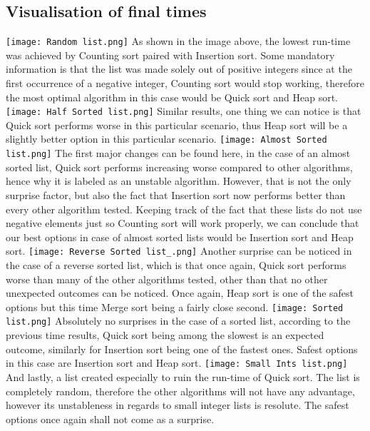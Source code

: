 \documentclass{article}
\begin{document}
\begin{center}
\section{Visualisation of final times}    

\texttt{[image: Random list.png]}
As shown in the image above, the lowest run-time was achieved by Counting sort paired with Insertion sort. Some mandatory information is that the list was made solely out of positive integers since at the first occurrence of a negative integer, Counting sort would stop working, therefore the most optimal algorithm in this case would be Quick sort and Heap sort.
\bigbreak
\texttt{[image: Half Sorted list.png]}
Similar results, one thing we can notice is that Quick sort performs worse in this particular scenario, thus Heap sort will be a slightly better option in this particular scenario.
\texttt{[image: Almost Sorted list.png]}
The first major changes can be found here, in the case of an almost sorted list, Quick sort performs increasing worse compared to other algorithms, hence why it is labeled as an unstable algorithm. However, that is not the only surprise factor, but also the fact that Insertion sort now performs better than every other algorithm tested. Keeping track of the fact that these lists do not use negative elements just so Counting sort will work properly, we can conclude that our best options in case of almost sorted lists would be Insertion sort and Heap sort.
\bigbreak
\texttt{[image: Reverse Sorted list\_.png]}
Another surprise can be noticed in the case of a reverse sorted list, which is that once again, Quick sort performs worse than many of the other algorithms tested, other than that no other unexpected outcomes can be noticed. Once again, Heap sort is one of the safest options but this time Merge sort being a fairly close second.
\texttt{[image: Sorted list.png]}
Absolutely no surprises in the case of a sorted list, according to the previous time results, Quick sort being among the slowest is an expected outcome, similarly for Insertion sort being one of the fastest ones. Safest options in this case are Insertion sort and Heap sort.
\bigbreak
\texttt{[image: Small Ints list.png]}
And lastly, a list created especially to ruin the run-time of Quick sort. The list is completely random, therefore the other algorithms will not have any advantage, however its unstableness in regards to small integer lists is resolute. The safest options once again shall not come as a surprise.
\end{center}
\end{document}
